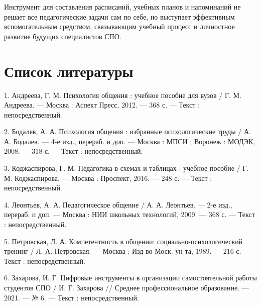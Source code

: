 \documentclass[
]{article}
\begin{document}
Инструмент для составления расписаний, учебных планов и напоминаний не
решает все педагогические задачи сам по себе, но выступает эффективным
вспомогательным средством, связывающим учебный процесс и личностное
развитие будущих специалистов СПО.

\section{\texorpdfstring{\textbf{Список
литературы}}{Список литературы}}\label{ux441ux43fux438ux441ux43eux43a-ux43bux438ux442ux435ux440ux430ux442ux443ux440ux44b}

1. Андреева, Г. М. Психология общения : учебное пособие для вузов / Г.
М. Андреева. --- Москва : Аспект Пресс, 2012. --- 368 с. --- Текст :
непосредственный.

2. Бодалев, А. А. Психология общения : избранные психологические труды /
А. А. Бодалев. --- 4-е изд., перераб. и доп. --- Москва : МПСИ ; Воронеж
: МОДЭК, 2008. --- 318 с. --- Текст : непосредственный.

3. Коджаспирова, Г. М. Педагогика в схемах и таблицах : учебное пособие
/ Г. М. Коджаспирова. --- Москва : Проспект, 2016. --- 248 с. --- Текст
: непосредственный.

4. Леонтьев, А. А. Педагогическое общение / А. А. Леонтьев. --- 2-е
изд., перераб. и доп. --- Москва : НИИ школьных технологий, 2009. ---
368 с. --- Текст : непосредственный.

5. Петровская, Л. А. Компетентность в общении: социально-психологический
тренинг / Л. А. Петровская. --- Москва : Изд-во Моск. ун-та, 1989. ---
216 с. --- Текст : непосредственный.

6. Захарова, И. Г. Цифровые инструменты в организации самостоятельной
работы студентов СПО / И. Г. Захарова // Среднее профессиональное
образование. --- 2021. --- № 6. --- Текст : непосредственный.
\end{document}
